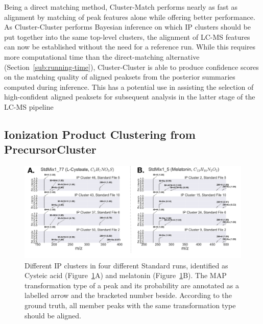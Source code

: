 Being a direct matching method, Cluster-Match performs nearly as fast as alignment by matching of peak features alone while offering better performance. As Cluster-Cluster performs Bayesian inference on which IP clusters should be put together into the same top-level clusters, the alignment of LC-MS features can now be established without the need for a reference run. While this requires more computational time than the direct-matching alternative (Section~\ref{sub:running-time}), Cluster-Cluster is able to produce confidence scores on the matching quality of aligned peaksets from the posterior summaries computed during inference. This has a potential use in assisting the selection of high-confident aligned peaksets for subsequent analysis in the latter stage of the LC-MS pipeline

\subsection{Ionization Product Clustering from PrecursorCluster\label{sub:precursor-cluster-results}}

\begin{figure}[!htbp]
\centering
\includegraphics[width=1.0\linewidth]{05-precursor-cluster/figures/metabolites.pdf}
\caption[Different IP clusters in four different Standard runs, identified as Cysteic acid (Figure~\ref{fig:06}A) and melatonin (Figure~\ref{fig:06}B).]{\label{fig:06} Different IP clusters in four different Standard runs, identified as Cysteic acid (Figure~\ref{fig:06}A) and melatonin (Figure~\ref{fig:06}B). The MAP transformation type of a peak and its probability are annotated as a labelled arrow and the bracketed number beside. According to the ground truth, all member peaks with the same transformation type should be aligned.}
\end{figure}

